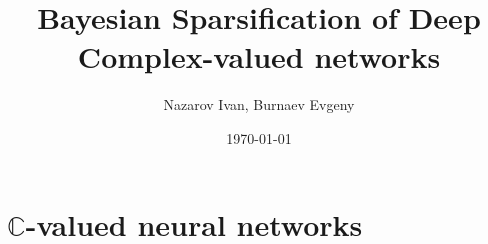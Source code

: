 \documentclass{beamer}
\title[Exam]{Bayesian Sparsification of Deep Complex-valued networks}
\author[Nazarov I., Burnaev E.]{Nazarov Ivan, Burnaev Evgeny}
\date{\today}
\institute[Skoltech]{Skolkovo Institute of Science and Technology}
\newcommand{\cplx}{\mathbb{C}}
\begin{document}
\begin{frame}
  \titlepage
\end{frame}


\section{$\cplx$-valued neural networks} %
\label{sec:complex_valued_networks}
\end{document}
